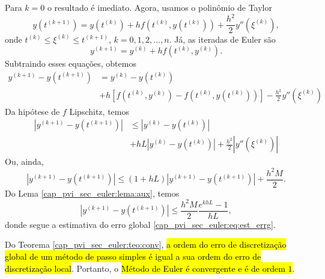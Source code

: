 \begin{dem}
  Para $k=0$ o resultado é imediato. Agora, usamos o polinômio de Taylor
  \begin{equation}
    y\left(t^{(k+1)}\right) = y\left(t^{(k)}\right) + hf\left(t^{(k)}, y\left(t^{(k)}\right)\right) + \frac{h^2}{2}y''\left(\xi^{(k)}\right),
  \end{equation}
  onde $t^{(k)} \leq \xi^{(k)} \leq t^{(k+1)}$, $k=0, 1, 2, \ldots, n$. Já, as iteradas de Euler são
  \begin{equation}
    y^{(k+1)} = y^{(k)} + hf\left(t^{(k)}, y^{(k)}\right).
  \end{equation}
  Subtraindo esses equações, obtemos
  \begin{equation}
    \begin{aligned}
      y^{(k+1)} - y\left(t^{(k+1)}\right) &= y^{(k)} - y\left(t^{(k)}\right) \\
      &+ h\left[f\left(t^{(k)}, y^{(k)}\right) - f\left(t^{(k)}, y\left(t^{(k)}\right)\right)\right] - \frac{h^2}{2}y''\left(\xi^{(k)}\right)
    \end{aligned}
  \end{equation}
  Da hipótese de $f$ Lipschitz, temos
  \begin{equation}
    \begin{aligned}
      \left|y^{(k+1)} - y\left(t^{(k+1)}\right)\right| &\leq \left|y^{(k)} - y\left(t^{(k)}\right)\right| \\
      &+ hL\left|y^{(k)} - y\left(t^{(k)}\right)\right| + \frac{h^2}{2}\left|y''\left(\xi^{(k)}\right)\right|
    \end{aligned}
  \end{equation}
  Ou, ainda,
  \begin{equation}
    \left|y^{(k+1)} - y\left(t^{(k+1)}\right)\right| \leq (1 + hL)\left|y^{(k+1)} - y\left(t^{(k+1)}\right)\right| + \frac{h^2M}{2}.
  \end{equation}
  Do Lema \ref{cap_pvi_sec_euler:lema:aux}, temos
  \begin{equation}
    \left|y^{(k+1)} - y\left(t^{(k+1)}\right)\right| \leq \frac{h^2M}{2}\frac{e^{khL}-1}{hL},
  \end{equation}
  donde segue a estimativa do erro global \eqref{cap_pvi_sec_euler:eq:est_errg}.
\end{dem}

\begin{obs}
  Do Teorema \ref{cap_pvi_sec_euler:teo:conv}, \hl{a ordem do erro de discretização global de um método de passo simples é igual a sua ordem do erro de discretização local}. Portanto, o \hl{Método de Euler é convergente e é de ordem $1$}.
\end{obs}

